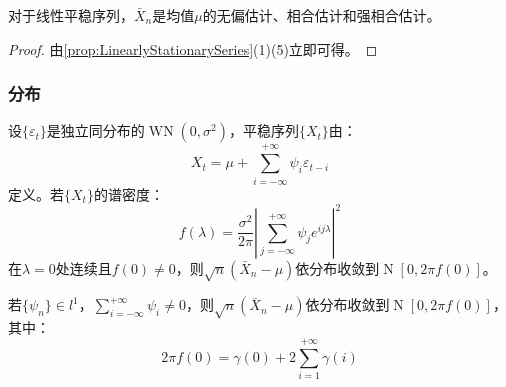 \begin{corollary}
	对于线性平稳序列，$\bar{X}_n$是均值$\mu$的无偏估计、相合估计和强相合估计。
\end{corollary}
\begin{proof}
	由\cref{prop:LinearlyStationarySeries}(1)(5)立即可得。
\end{proof}
\subsubsection{分布}
\begin{theorem}
	设$\{\varepsilon_t\}$是独立同分布的$\operatorname{WN}(0,\sigma^2)$，平稳序列$\{X_t\}$由：
	\begin{equation*}
		X_t=\mu+\sum_{i=-\infty}^{+\infty}\psi_i\varepsilon_{t-i}
	\end{equation*}
	定义。若$\{X_t\}$的谱密度：
	\begin{equation*}
		f(\lambda)=\frac{\sigma^2}{2\pi}\left|\sum_{j=-\infty}^{+\infty}\psi_je^{ij\lambda}\right|^2
	\end{equation*}
	在$\lambda=0$处连续且$f(0)\ne0$，则$\sqrt{n}(\bar{X}_n-\mu)$依分布收敛到$\operatorname{N}[0,2\pi f(0)]$。
\end{theorem}
\begin{corollary}
	若$\{\psi_n\}\in l^1$，$\sum\limits_{i=-\infty}^{+\infty}\psi_i\ne0$，则$\sqrt{n}(\bar{X}_n-\mu)$依分布收敛到$\operatorname{N}[0,2\pi f(0)]$，其中：
	\begin{equation*}
		2\pi f(0)=\gamma(0)+2\sum_{i=1}^{+\infty}\gamma(i)
	\end{equation*}
\end{corollary}
